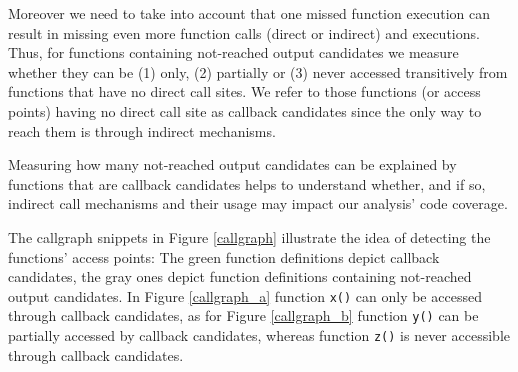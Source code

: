 \documentclass{sig-alternate-05-2015}
\begin{document}
Moreover we need to take into account that one missed function execution can result in missing even more function calls (direct or indirect) and executions. Thus, for functions containing not-reached output candidates we measure whether they can be (1) only, (2) partially or (3) never accessed transitively from functions that have no direct call sites. We refer to those functions (or access points) having no direct call site as callback candidates since the only way to reach them is through indirect mechanisms.

Measuring how many not-reached output candidates can be explained by functions that are callback candidates helps to understand whether, and if so, indirect call mechanisms and their usage may impact our analysis' code coverage.

The callgraph snippets in Figure \ref{callgraph} illustrate the idea of detecting the functions' access points: The green function definitions depict callback candidates, the gray ones depict function definitions containing not-reached output candidates. In Figure \ref{callgraph_a} function \texttt{x()} can only be accessed through callback candidates, as for Figure \ref{callgraph_b} function \texttt{y()} can be partially accessed by callback candidates, whereas function \texttt{z()} is never accessible through callback candidates.
\end{document}
